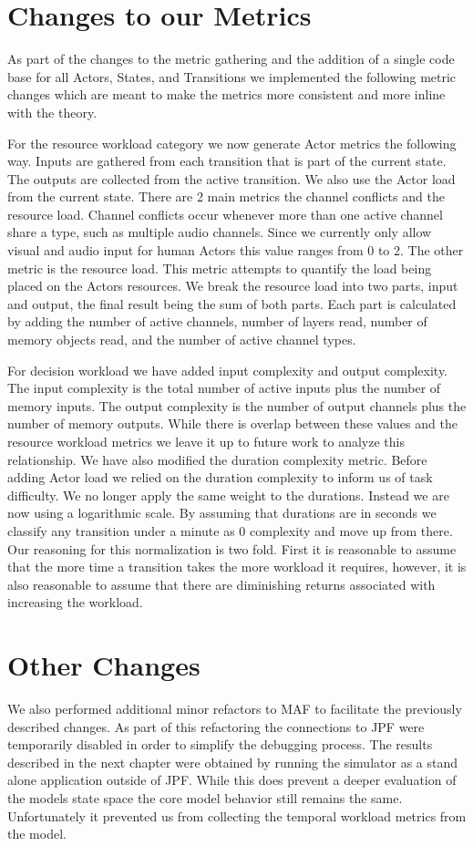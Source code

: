 \section{Changes to our Metrics}

As part of the changes to the metric gathering and the addition of a single code base for all Actors, States, and Transitions we implemented the following metric changes which are meant to make the metrics more consistent and more inline with the theory.

For the resource workload category we now generate Actor metrics the following way.  Inputs are gathered from each transition that is part of the current state.  The outputs are collected from the active transition.  We also use the Actor load from the current state.  There are 2 main metrics the channel conflicts and the resource load.  Channel conflicts occur whenever more than one active channel share a type, such as multiple audio channels.  Since we currently only allow visual and audio input for human Actors this value ranges from 0 to 2.  The other metric is the resource load.  This metric attempts to quantify the load being placed on the Actors resources.  We break the resource load into two parts, input and output, the final result being the sum of both parts.  Each part is calculated by adding the number of active channels, number of layers read, number of memory objects read, and the number of active channel types.

For decision workload we have added input complexity and output complexity.  The input complexity is the total number of active inputs plus the number of memory inputs.  The output complexity is the number of output channels plus the number of memory outputs.  While there is overlap between these values and the resource workload metrics we leave it up to future work to analyze this relationship.  We have also modified the duration complexity metric.  Before adding Actor load we relied on the duration complexity to inform us of task difficulty.  We no longer apply the same weight to the durations.  Instead we are now using a logarithmic scale.  By assuming that durations are in seconds we classify any transition under a minute as 0 complexity and move up from there.  Our reasoning for this normalization is two fold.  First it is reasonable to assume that the more time a transition takes the more workload it requires, however, it is also reasonable to assume that there are diminishing returns associated with increasing the workload.


\section{Other Changes}
We also performed additional minor refactors to MAF to facilitate the previously described changes.  As part of this refactoring the connections to JPF were temporarily disabled in order to simplify the debugging process.  The results described in the next chapter were obtained by running the simulator as a stand alone application outside of JPF.  While this does prevent a deeper evaluation of the models state space the core model behavior still remains the same.  Unfortunately it prevented us from collecting the temporal workload metrics from the model.
